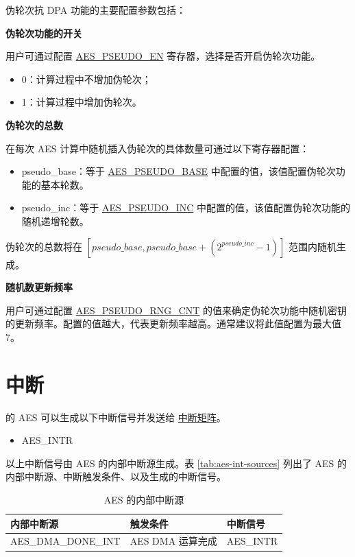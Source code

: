 \documentclass[main\_\_CN.tex]{subfiles}
\begin{document}
伪轮次抗 DPA 功能的主要配置参数包括：

\textbf{伪轮次功能的开关}

用户可通过配置 \hyperref[fielddesc:AESPSEUDOEN]{AES\_PSEUDO\_EN} 寄存器，选择是否开启伪轮次功能。
\begin{itemize}
    \item 0：计算过程中不增加伪轮次；
    \item 1：计算过程中增加伪轮次。
\end{itemize}

\textbf{伪轮次的总数}

在每次 AES 计算中随机插入伪轮次的具体数量可通过以下寄存器配置：
\begin{itemize}
    \item pseudo\_base：等于 \hyperref[fielddesc:AESPSEUDOBASE]{AES\_PSEUDO\_BASE} 中配置的值，该值配置伪轮次功能的基本轮数。
    \item pseudo\_inc：等于 \hyperref[fielddesc:AESPSEUDOINC]{AES\_PSEUDO\_INC} 中配置的值，该值配置伪轮次功能的随机递增轮数。
\end{itemize}
伪轮次的总数将在 $[pseudo\_base,pseudo\_base+(2^{pseudo\_inc}-1)]$ 范围内随机生成。

\textbf{随机数更新频率}

用户可通过配置 \hyperref[fielddesc:AESPSEUDORNGCNT]{AES\_PSEUDO\_RNG\_CNT} 的值来确定伪轮次功能中随机密钥的更新频率。配置的值越大，代表更新频率越高。通常建议将此值配置为最大值 7。



\section{中断}

\chipname 的 AES 可以生成以下中断信号并发送给 \hyperref[mod:intmtrx]{中断矩阵}。

    \begin{itemize}
        \item AES\_INTR
    \end{itemize}

以上中断信号由 AES 的内部中断源生成。表 \ref{tab:aes-int-sources} 列出了 AES 的内部中断源、中断触发条件、以及生成的中断信号。

\begin{longtable}{ | L{5cm} | L{6.5cm} | L{4cm} | }
\caption{AES 的内部中断源} \label{tab:aes-int-sources}
\\ \hline
{}
\textbf{内部中断源} & \textbf{触发条件}  &  \textbf{中断信号}\\ \hline
\label{int:AESDMADONEINT}AES\_DMA\_DONE\_INT  &  AES DMA 运算完成 &  AES\_INTR  \\ \hline
\end{longtable}
\end{document}
